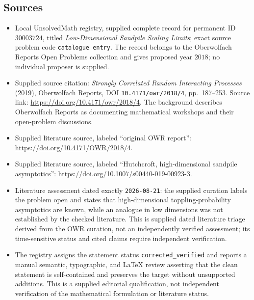 \documentclass[11pt]{article}
\begin{document}
\subsection{Sources}
\begin{itemize}
\item Local UnsolvedMath registry, supplied complete record for permanent ID \(30003724\), titled \emph{Low-Dimensional Sandpile Scaling Limits}; exact source problem code \texttt{catalogue entry}. The record belongs to the Oberwolfach Reports Open Problems collection and gives proposed year \(2018\); no individual proposer is supplied.
\item Supplied source citation: \emph{Strongly Correlated Random Interacting Processes} (2019), Oberwolfach Reports, DOI \texttt{10.4171/owr/2018/4}, pp.\ 187--253. Source link: \url{https://doi.org/10.4171/owr/2018/4}. The background describes Oberwolfach Reports as documenting mathematical workshops and their open-problem discussions.
\item Supplied literature source, labeled ``original OWR report'': \url{https://doi.org/10.4171/OWR/2018/4}.
\item Supplied literature source, labeled ``Hutchcroft, high-dimensional sandpile asymptotics'': \url{https://doi.org/10.1007/s00440-019-00923-3}.
\item Literature assessment dated exactly \texttt{2026-08-21}: the supplied curation labels the problem open and states that high-dimensional toppling-probability asymptotics are known, while an analogue in low dimensions was not established by the checked literature. This is supplied dated literature triage derived from the OWR curation, not an independently verified assessment; its time-sensitive status and cited claims require independent verification.
\item The registry assigns the statement status \texttt{corrected\_verified} and reports a manual semantic, typographic, and LaTeX review asserting that the clean statement is self-contained and preserves the target without unsupported additions. This is a supplied editorial qualification, not independent verification of the mathematical formulation or literature status.
\end{itemize}
\end{document}
